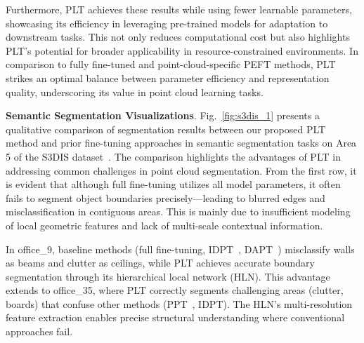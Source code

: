 Furthermore, PLT achieves these results while using fewer learnable parameters, showcasing its efficiency in leveraging pre-trained models for adaptation to downstream tasks. This not only reduces computational cost but also highlights PLT's potential for broader applicability in resource-constrained environments. In comparison to fully fine-tuned and point-cloud-specific PEFT methods, PLT strikes an optimal balance between parameter efficiency and representation quality, underscoring its value in point cloud learning tasks.

\textbf{Semantic Segmentation Visualizations}. Fig.~\ref{fig:s3dis_1} presents a qualitative comparison of segmentation results between our proposed PLT method and prior fine-tuning approaches in semantic segmentation tasks on Area 5 of the S3DIS dataset~\cite{armeni20163d}. The comparison highlights the advantages of PLT in addressing common challenges in point cloud segmentation. From the first row, it is evident that although full fine-tuning utilizes all model parameters, it often fails to segment object boundaries precisely—leading to blurred edges and misclassification in contiguous areas. This is mainly due to insufficient modeling of local geometric features and lack of multi-scale contextual information.


In office\_9, baseline methods (full fine-tuning, IDPT~\cite{zha2023instance}, DAPT~\cite{zhou2024dynamic}) misclassify walls as beams and clutter as ceilings, while PLT achieves accurate boundary segmentation through its hierarchical local network (HLN). This advantage extends to office\_35, where PLT correctly segments challenging areas (clutter, boards) that confuse other methods (PPT~\cite{zhang2024positional}, IDPT). The HLN's multi-resolution feature extraction enables precise structural understanding where conventional approaches fail.

